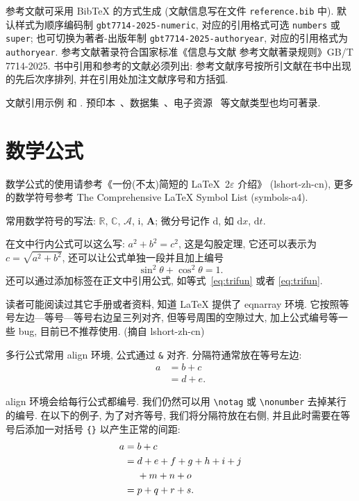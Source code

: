 参考文献可采用 BibTeX 的方式生成 (文献信息写在文件 \texttt{reference.bib} 中). 默认样式为顺序编码制 \texttt{gbt7714-2025-numeric}, 对应的引用格式可选 \texttt{numbers} 或 \texttt{super}; 也可切换为著者-出版年制 \texttt{gbt7714-2025-authoryear}, 对应的引用格式为 \texttt{authoryear}. 参考文献著录符合国家标准《信息与文献 参考文献著录规则》GB/T 7714-2025. 书中引用和参考的文献必须列出: 参考文献序号按所引文献在书中出现的先后次序排列, 并在引用处加注文献序号和方括弧.

文献引用示例 \cite[定理~1.1]{LiLiu1997} 和 \cite{Adams2003,Shen1994}. 预印本~\cite{BaoCai2012}、数据集~\cite{Zhou2023}、电子资源~\cite{DLMF} 等文献类型也均可著录.


\section{数学公式}\label{sec:mathEqEnv}

数学公式的使用请参考《一份(不太)简短的 \LaTeX~2$\varepsilon$ 介绍》 (lshort-zh-cn), 更多的数学符号参考 The Comprehensive LaTeX Symbol List (symbols-a4).

常用数学符号的写法: $\mathbb{R}$, $\mathbb{C}$, $\mathcal{A}$, $\mathrm{i}$, $\boldsymbol{A}$; 微分号记作 $\mathrm{d}$, 如 $\mathrm{d}x$, $\mathrm{d}t$.

在文中行内公式可以这么写: $a^2+b^2=c^2$, 这是勾股定理, 它还可以表示为 $c=\sqrt{a^2+b^2}$, 还可以让公式单独一段并且加上编号
\begin{equation}\label{eq:trifun}
\sin^2{\theta}+\cos^2{\theta}=1.
\end{equation}
还可以通过添加标签在正文中引用公式, 如等式~\eqref{eq:trifun} 或者 \ref{eq:trifun}.

读者可能阅读过其它手册或者资料, 知道 LaTeX 提供了 eqnarray 环境. 它按照等号左边—等号—等号右边呈三列对齐, 但等号周围的空隙过大, 加上公式编号等一些 bug, 目前已不推荐使用. (摘自 lshort-zh-cn)

多行公式常用 align 环境, 公式通过 \verb|&| 对齐. 分隔符通常放在等号左边:
\begin{align}
a & = b + c \\
& = d + e.
\end{align}

align 环境会给每行公式都编号. 我们仍然可以用 \verb|\notag| 或 \verb|\nonumber| 去掉某行的编号. 在以下的例子,
为了对齐等号, 我们将分隔符放在右侧, 并且此时需要在等号后添加一对括号 \verb|{}| 以产生正常的间距:
\begin{align}
a ={} & b + c \\
={} & d + e + f + g + h + i + j \notag \\
& + m + n + o \\
={} & p + q + r + s.
\end{align}

